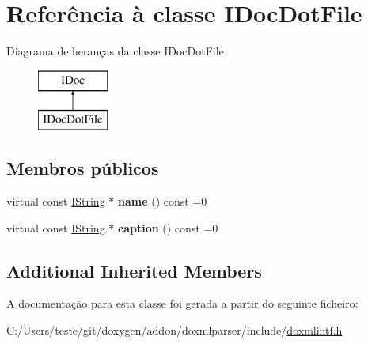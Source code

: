 \hypertarget{class_i_doc_dot_file}{\section{Referência à classe I\-Doc\-Dot\-File}
\label{class_i_doc_dot_file}
}
Diagrama de heranças da classe I\-Doc\-Dot\-File\begin{figure}[H]
\begin{center}
\leavevmode
\includegraphics[height=2.000000cm]{class_i_doc_dot_file}
\end{center}
\end{figure}
\subsection*{Membros públicos}
\begin{DoxyCompactItemize}
\item 
\hypertarget{class_i_doc_dot_file_af687440943d0a80c2b38cd5bb51b7a68}{virtual const \hyperlink{class_i_string}{I\-String} $\ast$ {\bfseries name} () const =0}\label{class_i_doc_dot_file_af687440943d0a80c2b38cd5bb51b7a68}

\item 
\hypertarget{class_i_doc_dot_file_a905140ec6bc1486d8f85deaa25657f28}{virtual const \hyperlink{class_i_string}{I\-String} $\ast$ {\bfseries caption} () const =0}\label{class_i_doc_dot_file_a905140ec6bc1486d8f85deaa25657f28}

\end{DoxyCompactItemize}
\subsection*{Additional Inherited Members}


A documentação para esta classe foi gerada a partir do seguinte ficheiro\-:\begin{DoxyCompactItemize}
\item 
C\-:/\-Users/teste/git/doxygen/addon/doxmlparser/include/\hyperlink{include_2doxmlintf_8h}{doxmlintf.\-h}\end{DoxyCompactItemize}
